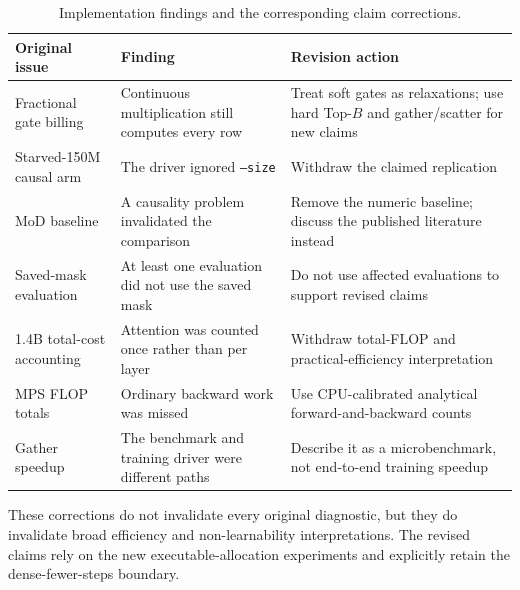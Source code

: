 \documentclass{article}
\begin{document}
\begin{table}[H]
\centering
\caption{Implementation findings and the corresponding claim corrections.}
\label{tab:audit}
{\small\setlength{\tabcolsep}{3pt}
\begin{tabular}{p{3.3cm}p{4.3cm}p{4.0cm}}
\toprule
Original issue & Finding & Revision action \\
\midrule
Fractional gate billing & Continuous multiplication still computes every row &
Treat soft gates as relaxations; use hard Top-$B$ and gather/scatter for new claims \\
Starved-150M causal arm & The driver ignored \texttt{--size} &
Withdraw the claimed replication \\
MoD baseline & A causality problem invalidated the comparison &
Remove the numeric baseline; discuss the published literature instead \\
Saved-mask evaluation & At least one evaluation did not use the saved mask &
Do not use affected evaluations to support revised claims \\
1.4B total-cost accounting & Attention was counted once rather than per layer &
Withdraw total-FLOP and practical-efficiency interpretation \\
MPS FLOP totals & Ordinary backward work was missed &
Use CPU-calibrated analytical forward-and-backward counts \\
Gather speedup & The benchmark and training driver were different paths &
Describe it as a microbenchmark, not end-to-end training speedup \\
\bottomrule
\end{tabular}}
\end{table}

These corrections do not invalidate every original diagnostic, but they do
invalidate broad efficiency and non-learnability interpretations. The revised
claims rely on the new executable-allocation experiments and explicitly retain
the dense-fewer-steps boundary.
\end{document}

